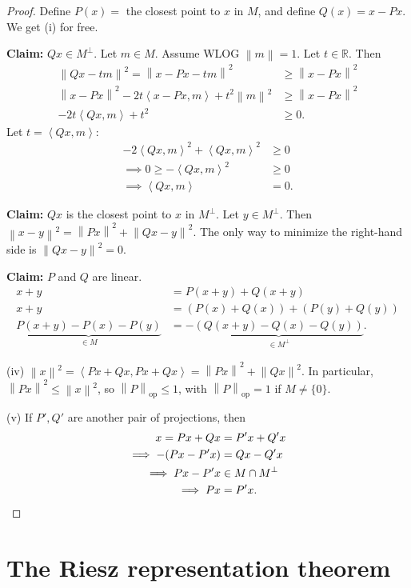 \documentclass[12pt]{article}
\newcommand{\norm}[1]{\left\| #1 \right\|}
\newcommand{\ip}[2]{\left\langle #1, #2 \right\rangle}
\newcommand{\R}{\mathbb{R}}
\theoremstyle{definition}
\begin{document}
\begin{proof}
	Define $P(x) = $ the closest point to $x$ in $M$, and define $Q(x) = x - Px$.
	We get (i) for free.

	\textbf{Claim: } $Qx \in M^\perp$.
	Let $m \in M$.
	Assume WLOG $\norm{m} = 1$.
	Let $t \in \R$.
	Then
	\begin{align*}
		\norm{Qx - tm}^2 = \norm{x - Px - tm}^2 &\geq \norm{x - Px}^2 \\
		\norm{x-Px}^2 - 2t\ip{x-Px}{m} + t^2 \norm{m}^2 &\geq \norm{x-Px}^2 \\
		-2t \ip{Qx}{m} + t^2 &\geq 0.
	\end{align*}
	Let $t = \ip{Qx}{m}$:
	\begin{align*}
		-2\ip{Qx}{m}^2 + \ip{Qx}{m}^2 &\geq 0 \\
		\implies 0 \geq -\ip{Qx}{m}^2 &\geq 0 \\
		\implies \ip{Qx}{m} &= 0.
	\end{align*}

	\textbf{Claim: } $Qx$ is the closest point to $x$ in $M^\perp$.
	Let $y \in M^\perp$.
	Then $\norm{x-y}^2 = \norm{Px}^2 + \norm{Qx-y}^2$.
	The only way to minimize the right-hand side is $\norm{Qx - y}^2 = 0$.

	\textbf{Claim: } $P$ and $Q$ are linear.
	\begin{align*}
		x + y &= P(x+y) + Q(x+y) \\
		x + y &= (P(x) + Q(x)) + (P(y) + Q(y)) \\
		\underbrace{P(x+y) - P(x) - P(y)}_{\in M} &= -\underbrace{\left( Q(x+y) - Q(x) - Q(y) \right)}_{\in M^\perp}.
	\end{align*}

	(iv) $\norm{x}^2 = \ip{Px + Qx}{Px + Qx} = \norm{Px}^2 + \norm{Qx}^2$.
	In particular, $\norm{Px}^2 \leq \norm{x}^2$, so $\norm{P}_{\mathrm{op}} \leq 1$, with $\norm{P}_{\mathrm{op}} = 1$ if $M \neq \lbrace 0 \rbrace$.

	(v) If $P', Q'$ are another pair of projections, then
	\begin{align*}
		x = Px + Qx &= P'x + Q'x \\
		\implies -(Px - P'x) &= Qx - Q'x \\
		\implies Px - P'x &\in M \cap M^\perp \\
		\implies Px &= P'x. \qedhere
	\end{align*}
\end{proof}

\section{The Riesz representation theorem}
\end{document}
